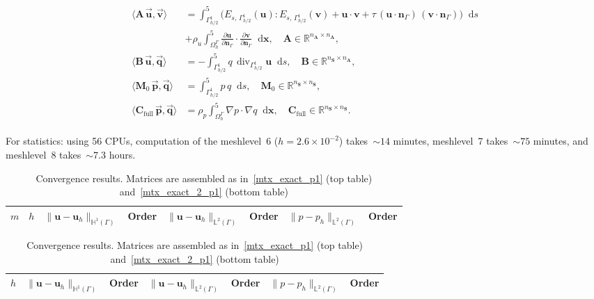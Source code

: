 \documentclass[12pt]{article}
\newcommand{\vect}[1]{\boldsymbol{\mathbf{#1}}}
\newcommand*\diff{\mathop{}\!\mathrm{d}}
\DeclareMathOperator{\Div}{div}
\newcommand{\LTwoSpace}[1][\Gamma]{{\mathbb L^2\left({#1}\right)}}
\newcommand{\HOneSpace}[1][\Gamma]{{\mathbb H^1\left({#1}\right)}}
\begin{document}
\begin{align}\begin{split}\label{mtx_exact_2_p1}
	\langle \vect A\,\vec{\vect u}, \vec{\vect v} \rangle &= 
		\int^5_{\Gamma_{h/2}^1} \big( E_{s,\,\Gamma_{h/2}^1}(\vect u) : E_{s,\,\Gamma_{h/2}^1}(\vect v) + \vect u\cdot\vect v + \tau\,(\vect u\cdot\vect n_{\Gamma})\,(\vect v\cdot\vect n_{\Gamma}) \big) \diff{s} \\
	&
		+ \rho_u \int^5_{\Omega_h^{\Gamma}} \frac{\partial \vect u}{\partial\vect n_{\Gamma}}\cdot\frac{\partial \vect v}{\partial\vect n_{\Gamma}} \diff{\vect x}, \quad \vect A \in \mathbb R^{n_{\vect A} \times n_{\vect A}},\\
	\langle \vect B\,\vec{\vect u}, \vec{\vect q} \rangle &= 
		-\int^5_{\Gamma_{h/2}^1} q\,\Div_{\Gamma_{h/2}^1} \vect u \diff{s}, \quad \vect B \in \mathbb R^{n_{\vect S} \times n_{\vect A}},\\
	\langle \vect M_0\,\vec{\vect p}, \vec{\vect q} \rangle &=
		\int^5_{\Gamma_{h/2}^1} p\,q \diff{s}, \quad \vect M_0 \in \mathbb R^{n_{\vect S} \times n_{\vect S}},\\
	\langle \vect C_{\text{full}}\,\vec{\vect p}, \vec{\vect q} \rangle &=
		\rho_p \int^5_{\Omega^{\Gamma}_h} \nabla p \cdot \nabla q \diff{\vect x}, \quad \vect C_{\text{full}} \in \mathbb R^{n_{\vect S} \times n_{\vect S}}.
\end{split}\end{align}

For statistics: using 56 CPUs, computation of the meshlevel~6 ($h = 2.6\times10^{-2}$) takes~${\sim}14$ minutes, meshlevel~7 takes~${\sim}75$ minutes, and meshlevel~8 takes~${\sim}7.3$ hours.

\begin{table}[h!]
	\centering\small
	\caption{Convergence results. Matrices are assembled as in~\eqref{mtx_exact_p1} (top table) and~\eqref{mtx_exact_2_p1} (bottom table)}
	\label{tab:p1p1_conv}
	\begin{subtable}{1.\linewidth}\centering
		\begin{tabular}[1.3]{|c|c||c|c||c|c||c|c|}
			\hline
			$m$ & $h$ & $\|\vect u - \vect u_h\|_{\HOneSpace}$ & Order & $\|\vect u - \vect u_h\|_{\LTwoSpace}$ & Order & $\|p - p_h\|_{\LTwoSpace}$ & Order \\
			\hline
			
		\end{tabular}
	\end{subtable}
	\vskip 4mm	
	\begin{subtable}{1.\linewidth}\centering
		\begin{tabular}[1.3]{|c||c|c||c|c||c|c|}
			\hline
			$h$ & $\|\vect u - \vect u_h\|_{\HOneSpace}$ & Order & $\|\vect u - \vect u_h\|_{\LTwoSpace}$ & Order & $\|p - p_h\|_{\LTwoSpace}$ & Order \\
			\hline
			
		\end{tabular}
	\end{subtable}
\end{table}
\end{document}
